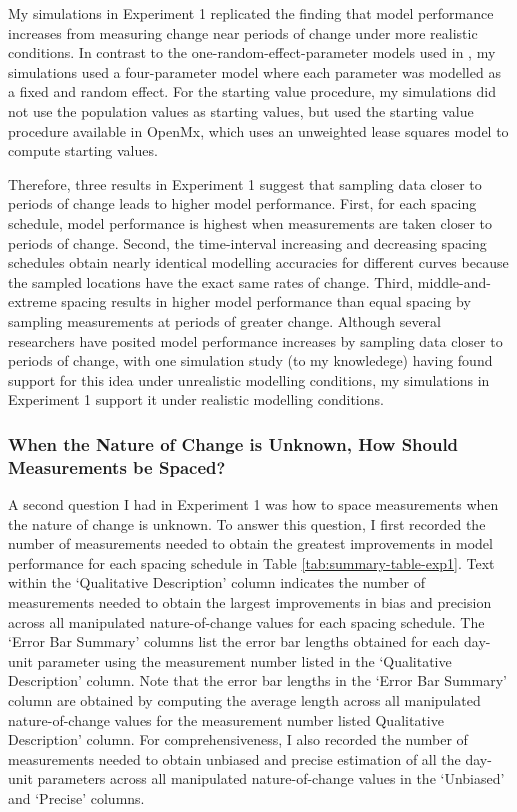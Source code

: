 \documentclass[
12pt, %
twoside,
english]{guelphthesis}
\begin{document}
My simulations in Experiment 1 replicated the finding that model performance increases from measuring change near periods of change under more realistic conditions. In contrast to the one-random-effect-parameter models used in \textcite{timmons2015}, my simulations used a four-parameter model where each parameter was modelled as a fixed and random effect. For the starting value procedure, my simulations did not use the population values as starting values, but used the starting value procedure available in OpenMx, which uses an unweighted lease squares model to compute starting values.

Therefore, three results in Experiment 1 suggest that sampling data closer to periods of change leads to higher model performance. First, for each spacing schedule, model performance is highest when measurements are taken closer to periods of change. Second, the time-interval increasing and decreasing spacing schedules obtain nearly identical modelling accuracies for different curves because the sampled locations have the exact same rates of change. Third, middle-and-extreme spacing results in higher model performance than equal spacing by sampling measurements at periods of greater change. Although several researchers have posited model performance increases by sampling data closer to periods of change, with one simulation study (to my knowledege) having found support for this idea under unrealistic modelling conditions, my simulations in Experiment 1 support it under realistic modelling conditions.

\hypertarget{unknown}{%
\subsubsection{When the Nature of Change is Unknown, How Should Measurements be Spaced?}\label{unknown}}

A second question I had in Experiment 1 was how to space measurements when the nature of change is unknown. To answer this question, I first recorded the number of measurements needed to obtain the greatest improvements in model performance for each spacing schedule in Table \ref{tab:summary-table-exp1}. Text within the `Qualitative Description' column indicates the number of measurements needed to obtain the largest improvements in bias and precision across all manipulated nature-of-change values for each spacing schedule. The `Error Bar Summary' columns list the error bar lengths obtained for each day-unit parameter using the measurement number listed in the `Qualitative Description' column. Note that the error bar lengths in the `Error Bar Summary' column are obtained by computing the average length across all manipulated nature-of-change values for the measurement number listed Qualitative Description' column. For comprehensiveness, I also recorded the number of measurements needed to obtain unbiased and precise estimation of all the day-unit parameters across all manipulated nature-of-change values in the `Unbiased' and `Precise' columns.
\end{document}
